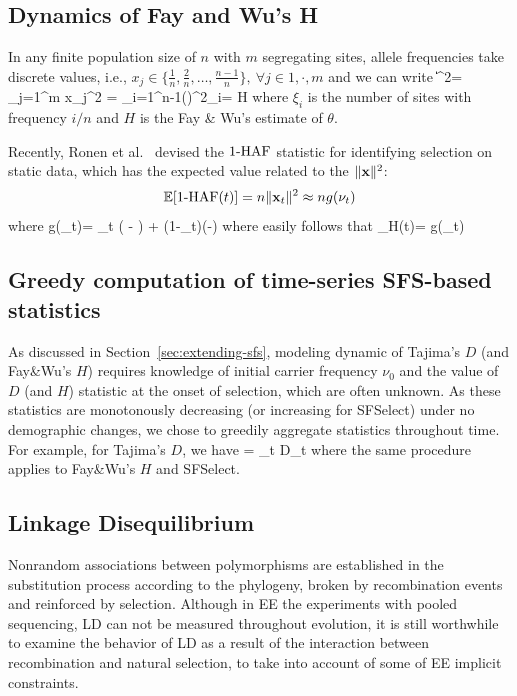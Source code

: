 \documentclass[11pt]{article}
\begin{document}
\subsection{Dynamics of Fay and Wu's H}\label{app:h}
In any finite population size of $n$ with $m$ segregating sites, 
allele frequencies take 
discrete values, i.e.,  $x_j \in 
\{\frac{1}{n},\frac{2}{n},\ldots,\frac{n-1}{n}\}, \ \forall j \in{1,\cdot,m}$ 
and we can write
\beq
\|\bfx\|^2= \sum_{j=1}^{m} x_j^2 = 
\sum_{i=1}^{n-1}\left(\right)^2\xi_i= 
H 
\eeq
where $\xi_i$ is the number of sites with frequency $i/n$ and $H$ is the 
Fay \& Wu's estimate of $\theta$.

Recently, Ronen et al.~\cite{ronen2015predicting} devised the $1\text{-HAF}$ 
statistic for identifying selection on static data, which has the expected 
value related to the $\|{\mathbf x}\|^2$:
\begin{equation} 
{\mathbb E}[1\text{-HAF}(t)]= n\| {\mathbf x}_t\|^2\approx ng(\nu_t)
\end{equation} 
where
\beq
g(\nu_t)= \theta \nu_t \left( - \right) +
\theta (1-\nu_t)\left(-\right)
\label{eq:hafscorepooled}
\eeq
where easily follows that
\beq
\theta_H(t)= g(\nu_t)
\eeq
\subsection{Greedy computation of time-series SFS-based  
statistics}\label{app:agg}
As discussed in Section~\ref{sec:extending-sfs}, modeling dynamic of Tajima's 
$D$ (and Fay\&Wu's $H$) requires knowledge of initial carrier frequency $\nu_0$ 
and the value of $D$ (and $H$) statistic at the onset of selection, which are 
often unknown.
As these statistics are monotonously decreasing (or increasing for SFSelect) 
under no demographic changes, we chose to greedily aggregate statistics 
throughout time. For example, for Tajima's $D$, we have 
\beq
\Dc = \sum_{t \in \Tc} D_t
\eeq
where the same procedure applies to Fay\&Wu's $H$ and SFSelect.


\subsection{Linkage Disequilibrium}
Nonrandom associations between polymorphisms are established in the 
substitution process according to the phylogeny, broken by recombination events 
and reinforced by selection. Although in EE the experiments with pooled 
sequencing, LD can not be measured throughout evolution, it is still worthwhile 
to examine the behavior of LD as a result of the interaction between 
recombination and natural selection, to take into account of some of EE 
implicit constraints. 
\end{document}
